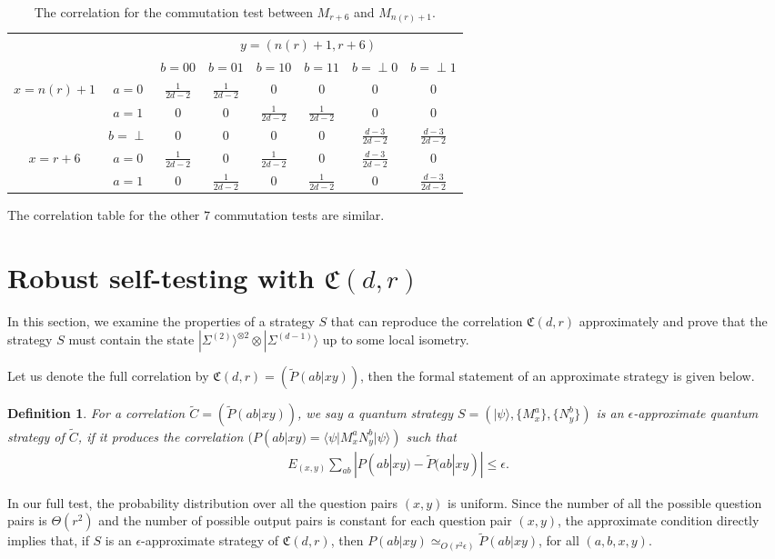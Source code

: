\documentclass[11pt,letterpaper]{article}
\newcommand{\ket}[1]{|#1\rangle}
\newcommand{\bra}[1]{\langle#1|}
\newcommand{\x}{\otimes}
\newcommand{\1}{\mathbb{1}}
\newcommand{\EPR}[1]{\Sigma^{(#1)}}
\newcommand{\nr}{n(r)}
\newcommand{\fC}{\mathfrak{C}}
\newcommand{\pr}[2]{P(#1|#2)}
\newcommand{\tpr}[2]{\tilde{P}(#1|#2)}
\newcommand{\ep}{\epsilon}
\newcommand{\appd}[1]{\simeq_{#1}}
\newtheorem{definition}[theorem]{Definition}
\theoremstyle{definition}
\begin{document}
\begin{table}[H]
\begin{center}
\begin{tabular}{|c|c||c|c|c|c|c|c|}
\hline
\multicolumn{2}{|c|}{} &
\multicolumn{6}{|c|}{$y=(\nr+1, r+6)$}\\
\cline{3-8}
\multicolumn{2}{|c|}{} &
$b = 00$ & $b=01$ & 
$b = 10$ & $b=11$ &
$b = \perp0$ & $b= \perp1$   \\
\hline
\hline
\multirow{3}{*}{$x = \nr+1$} & $a=0$ & $\frac{1}{2d-2}$ & $\frac{1}{2d-2}$ &  $0$
& $0$ & $0$ & $0$  \\
\cline{2-8}
&$a=1$ & $0$ & $0 $ & $\frac{1}{2d-2}$ 
&  $\frac{1}{2d-2}$ & $0$ & $0$  \\
\cline{2-8}
&$b=\perp$ & 0 & 0 & $0$ 
&  0 & $\frac{d-3}{2d-2}$ & $\frac{d-3}{2d-2} $  \\
\hline
\multirow{2}{*}{$x = r+6$} & $a=0$ & $\frac{1}{2d-2}$ & $0$ & $\frac{1}{2d-2}$ 
& $0$ & $\frac{d-3}{2d-2}$ & 0  \\
\cline{2-8}
&$a=1$ & $0$ & $\frac{1}{2d-2}$ & $0$ 
&  $\frac{1}{2d-2}$ & $0$ & $\frac{d-3}{2d-2}$  \\
\hline
\end{tabular}
\end{center}
\caption{The correlation for the commutation test between $M_{r+6}$ and $M_{\nr+1}$.}
\label{tbl:comm}
\end{table}
The correlation table for the other $7$ commutation tests are similar.

\section{Robust self-testing with $\fC(d,r)$}
\label{sec:main}
In this section, we examine the properties of a strategy $S$ that can reproduce the
correlation $\fC(d,r)$ approximately and 
prove that the strategy $S$ must contain the state $\ket{\EPR{2}}^{\x 2} \x \ket{\EPR{d-1}}$
up to some local isometry.

Let us denote the full correlation by $\fC(d,r) = ( \tpr{ab}{xy} )$, then the formal statement of an approximate strategy is given below.
\begin{definition}
	For a correlation $\tilde{C} = (\tpr{ab}{xy})$,
	we say a quantum strategy $S = (\ket{\psi}, \{M_x^a\}, \{N_y^b\})$
	is an $\ep$-approximate quantum strategy of $\tilde{C}$, 
	if it produces the correlation
	$( \pr{ab}{xy} = \bra{\psi} M_x^a N_y^b \ket{\psi} )$ such that
	\begin{align}
	E_{(x,y)} \sum_{ab} |\pr{ab}{xy} - \tpr{ab}{xy}| \leq \ep.
	\end{align}
\end{definition}
In our full test, the probability distribution over all the question pairs $(x,y)$ is uniform.
Since the number of all the possible question pairs is $\Theta(r^2)$ and 
the number of possible output pairs is constant for each question pair $(x,y)$, 
the approximate condition directly implies that, if $S$ is an $\ep$-approximate strategy
of $\fC(d,r)$, then
$\pr{ab}{xy} \appd{O(r^2\ep)} \tpr{ab}{xy}$, for all $(a,b,x,y)$.
\end{document}
